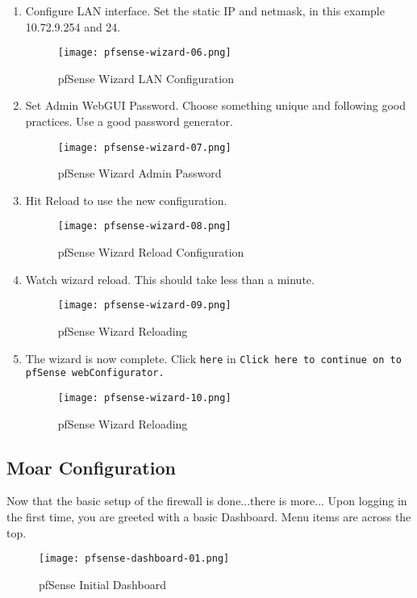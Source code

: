 \begin{enumerate}
 \item Configure LAN interface. Set the static IP and netmask, in this example 10.72.9.254 and 24.
\begin{figure}[h!]
\texttt{[image: pfsense-wizard-06.png]}
 \caption{pfSense Wizard LAN Configuration}
 \label{fig:pfsense-wizard-06}
\end{figure}

 \item Set Admin WebGUI Password. Choose something unique and following good practices. Use a good password generator.
\begin{figure}[h!]
\texttt{[image: pfsense-wizard-07.png]}
 \caption{pfSense Wizard Admin Password}
 \label{fig:pfsense-wizard-07}
\end{figure}

 \item Hit Reload to use the new configuration.
\begin{figure}[h!]
\texttt{[image: pfsense-wizard-08.png]}
 \caption{pfSense Wizard Reload Configuration}
 \label{fig:pfsense-wizard-08}
\end{figure}

 \item Watch wizard reload. This should take less than a minute.
\begin{figure}[h!]
\texttt{[image: pfsense-wizard-09.png]}
 \caption{pfSense Wizard Reloading}
 \label{fig:pfsense-wizard-09}
\end{figure}

 \item The wizard is now complete. Click \texttt{here} in \texttt{Click here to continue on to pfSense webConfigurator.}
\begin{figure}[h!]
\texttt{[image: pfsense-wizard-10.png]}
 \caption{pfSense Wizard Reloading}
 \label{fig:pfsense-wizard-10}
\end{figure}

\end{enumerate}

\subsection{Moar Configuration}
Now that the basic setup of the firewall is done...there is more...
Upon logging in the first time, you are greeted with a basic Dashboard. Menu items are across the top.
\begin{figure}[h!]
\texttt{[image: pfsense-dashboard-01.png]}
 \caption{pfSense Initial Dashboard}
 \label{fig:pfsense-dashboard-01}
\end{figure}


